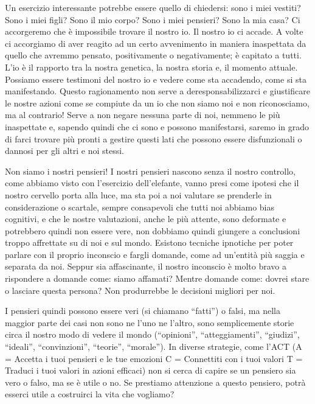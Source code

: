 \documentclass[12pt]{book} %
\begin{document}
\bigskip

Un esercizio interessante potrebbe essere quello di
chiedersi: sono i miei vestiti? Sono i miei figli? Sono il mio corpo? Sono i miei pensieri? Sono la mia casa? Ci
accorgeremo che è impossibile trovare il nostro io. Il nostro io ci accade. A volte ci accorgiamo di aver reagito ad un
certo avvenimento in maniera inaspettata da quello che avremmo pensato, positivamente o negativamente; è capitato a
tutti. L'io è il rapporto tra la nostra genetica, la nostra storia e, il momento attuale. Possiamo
essere testimoni del nostro io e vedere come sta accadendo, come si sta manifestando. Questo ragionamento non serve a
deresponsabilizzarci e giustificare le nostre azioni come se compiute da un io che non siamo noi e non riconosciamo, ma
al contrario! Serve a non negare nessuna parte di noi, nemmeno le più inaspettate e, sapendo quindi che ci sono e
possono manifestarsi, saremo in grado di farci trovare più pronti a gestire questi lati che possono essere
disfunzionali o dannosi per gli altri e noi stessi.

Non siamo i nostri pensieri! I nostri pensieri nascono senza il nostro controllo, come abbiamo visto con
l'esercizio dell'elefante, vanno presi come ipotesi che il nostro cervello
porta alla luce, ma sta poi a noi valutare se prenderle in considerazione o scartale, sempre consapevoli che tutti noi
abbiamo bias cognitivi, e che le nostre valutazioni, anche le più attente, sono deformate e potrebbero quindi non
essere vere, non dobbiamo quindi giungere a conclusioni troppo affrettate su di noi e sul mondo. Esistono tecniche
ipnotiche per poter parlare con il proprio inconscio e fargli domande, come ad un'entità più saggia e separata da noi.
Seppur sia affascinante, il nostro inconscio è molto bravo a rispondere a domande come: siamo affamati? Mentre domande
come: dovrei stare o lasciare questa persona? Non produrrebbe le decisioni migliori per noi. 

I pensieri quindi possono essere veri (si chiamano “fatti”) o falsi, ma nella maggior parte dei casi non sono ne
l'uno ne l'altro, sono semplicemente storie circa il nostro modo di vedere il
mondo (“opinioni”, “atteggiamenti”, “giudizi”, “ideali”, “convinzioni”, “teorie”, “morale”). In diverse strategie, come
l'ACT (A = Accetta i tuoi pensieri e le tue emozioni C = Connettiti con i tuoi valori T = Traduci
i tuoi valori in azioni efficaci) non si cerca di capire se un pensiero sia vero o falso, ma se è utile o no. Se
prestiamo attenzione a questo pensiero, potrà esserci utile a costruirci la vita che vogliamo?
\end{document}
